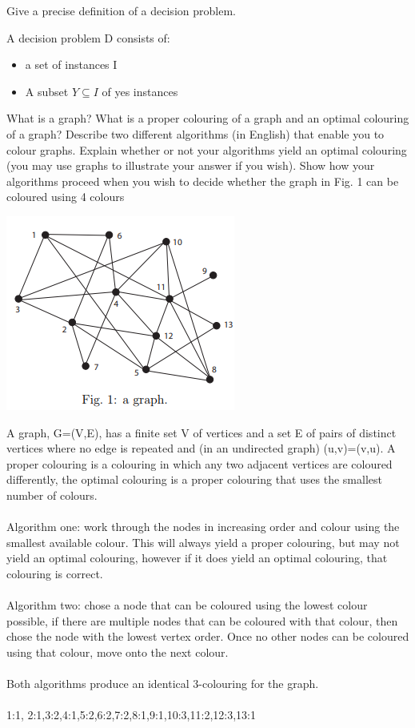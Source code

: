 \documentclass[addpoints]{exam}
\begin{document}
\begin{questions}
\question[2]Give a precise definition of a decision problem.
\begin{solution}[2in]
	A decision problem D consists of:
	\begin{itemize}
		\item a set of instances I
		\item A subset $Y\subseteq I$ of yes instances
	\end{itemize}
\end{solution}
\question[20]What is a graph? What is a proper colouring of a graph and an optimal
colouring of a graph? Describe two different algorithms (in English)
that enable you to colour graphs. Explain whether or not your
algorithms yield an optimal colouring (you may use graphs to illustrate
your answer if you wish). Show how your algorithms proceed when you
wish to decide whether the graph in Fig. 1 can be coloured using 4
colours
\begin{center}
	\includegraphics[scale=0.7]{graph}
\end{center}
\begin{solution}[2in]
	A graph, G=(V,E), has a finite set V of vertices and a set E of pairs of
	distinct vertices where no edge is repeated and (in an undirected
	graph) (u,v)=(v,u). A proper colouring is a colouring in which any two
	adjacent vertices are coloured differently, the optimal colouring is a
	proper colouring that uses the smallest number of colours.\\
	\\
	Algorithm one: work through the nodes in increasing order and
	colour using the smallest available colour. This will always yield a
	proper colouring, but may not yield an optimal colouring, however if
	it does yield an optimal colouring, that colouring is correct.\\
	\\
	Algorithm two: chose a node that can be coloured using the lowest
	colour possible, if there are multiple nodes that can be coloured with
	that colour, then chose the node with the lowest vertex order. Once no
	other nodes can be coloured using that colour, move onto the next
	colour.\\
	\\
	Both algorithms produce an identical 3-colouring for the graph.\\
	\\
	1:1, 2:1,3:2,4:1,5:2,6:2,7:2,8:1,9:1,10:3,11:2,12:3,13:1
\end{solution}


\end{questions}
\end{document}
